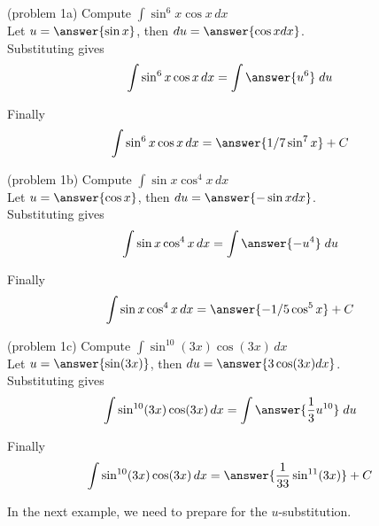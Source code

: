 \documentclass[handout]{ximera}
\begin{document}
\begin{problem}(problem 1a) 
Compute $\displaystyle{\int \sin^6 x\cos x \, dx}$\\

Let $u = \answer{\sin x}$, \; then $du = \answer{\cos x dx}$.\\

Substituting gives
\[
\int \sin^6 x\cos x \, dx = \int \answer{u^6} \; du
\]

Finally
\[
\int \sin^{6} x\cos x \, dx = \answer{1/7 \sin^7 x} + C
\]

\end{problem}



\begin{problem}(problem 1b) 
Compute $\displaystyle{\int \sin x \cos^4 x \, dx}$\\

Let $u = \answer{\cos x}$, \; then $du = \answer{-\sin x dx}$.\\

Substituting gives 
\[
\int \sin x\cos^4 x \, dx = \int \answer{-u^4} \; du
\]

Finally 
\[
\int \sin x\cos^4 x \, dx = \answer{-1/5 \cos^5 x} + C
\]

\end{problem}



\begin{problem}(problem 1c)
Compute $\displaystyle{\int \sin^{10}(3x)\cos(3x) \, dx}$\\

Let $u = \answer{\sin(3x)}$, \; then $du = \answer{3\cos(3x) dx}$.\\

Substituting gives 
\[
\int \sin^{10}(3x)\cos(3x) \, dx = \int \answer{\frac13 u^{10}} \; du
\]

Finally
\[
\int \sin^{10}(3x)\cos(3x) \, dx = \answer{\frac{1}{33} \sin^{11}(3x)} + C
\]

\end{problem}



In the next example, we need to prepare for the $u$-substitution. 
\end{document}
